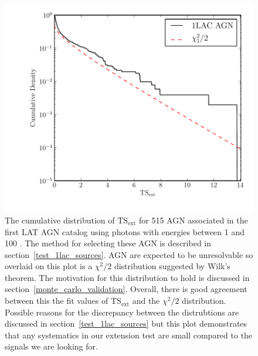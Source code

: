 \documentclass[12pt,preprint]{aastex}
\newcommand{\gev}{\text{GeV}\xspace}
\newcommand{\tsext}{{\ensuremath{\text{TS}_\text{ext}}}\xspace}
\begin{document}
\clearpage
\begin{figure}
  \begin{center}
    \includegraphics{source_plots/agn.pdf}
    \end{center}
    \caption{The cumulative distribution of \tsext for 515 AGN associated
    in the first LAT AGN catalog using photons with energies between 1
    \gev and 100 \gev.  The method for selecting these AGN is described in
    section~\ref{test_1lac_sources}.  AGN are expected to be unresolvable
    so overlaid on this plot is a $\chi^2/2$ distribution suggested by
    Wilk's theorem.  The motivation for this distribution to hold is
    discussed in section~\ref{monte_carlo_validation}.  Overall, there
    is good agreement between this the fit values of \tsext and the
    $\chi^2/2$ distribution.  Possible reasons for the discrepancy between
    the distrubtions are discussed in section~\ref{test_1lac_sources}
    but this plot demonstrates that any systematics in our extension
    test are small compared to the signals we are looking for.
    }\label{agn_ts_ext}
  \end{figure}


\end{document}
